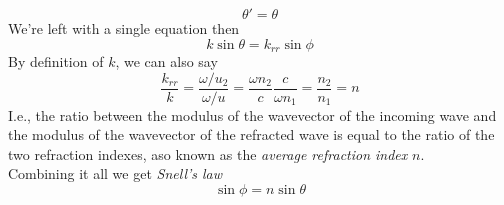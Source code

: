 \documentclass[../electromagnetism.tex]{subfiles}
\begin{document}
\begin{equation*}
	\theta'=\theta
\end{equation*}
We're left with a single equation then
\begin{equation*}
	k\sin\theta=k_{rr}\sin\phi
\end{equation*}
By definition of $k$, we can also say
\begin{equation*}
	\frac{k_{rr}}{k}=\frac{\omega/u_2}{\omega/u}=\frac{\omega n_2}{c}\frac{c}{\omega n_1}=\frac{n_2}{n_1}=n
\end{equation*}
I.e., the ratio between the modulus of the wavevector of the incoming wave and the modulus of the wavevector of the refracted wave is equal to the ratio of the two refraction indexes, aso known as the \textit{average refraction index} $n$.\\
Combining it all we get \textit{Snell's law}
\begin{equation}
	\sin\phi=n\sin\theta
	\label{eq:snelllaw}
\end{equation}
\end{document}
